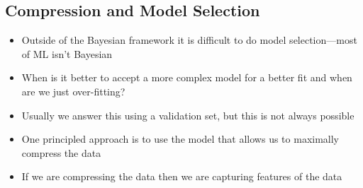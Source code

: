 \Outline %

\begin{slide}
\section[-1]{Compression and Model Selection}
  
\begin{PauseHighLight}
  \begin{itemize}
  \item Outside of the Bayesian framework it is difficult to do model
    selection\pause---most of ML isn't Bayesian\pauseb
  \item When is it better to accept a more complex model for a better
    fit and when are we just over-fitting?\pause
  \item Usually we answer this using a validation set, but this is not
    always possible\pause
  \item One principled approach is to use the model that allows us to
    maximally compress the data\pause
  \item If we are compressing the data then we are capturing features
    of the data\pause
  \end{itemize}
\end{PauseHighLight}

\end{slide}


